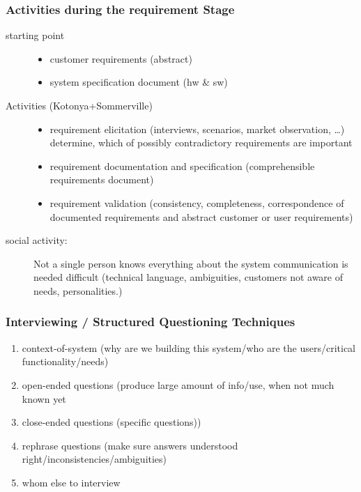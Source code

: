 \documentclass[a4paper, 10pt]{article}
\begin{document}
\subsubsection{Activities during the requirement Stage}
	\begin{description}
		\item[starting point] 
			\begin{itemize}
				\item customer requirements (abstract)
				\item system specification document (hw \& sw)
			\end{itemize}
		\item[Activities (Kotonya+Sommerville)]
			\begin{itemize}
				\item requirement elicitation (interviews, scenarios, market observation, \dots) \\
				determine, which of possibly contradictory requirements are important
				\item requirement documentation and specification (comprehensible requirements document)
				\item requirement validation (consistency, completeness, correspondence of documented requirements and abstract customer or user requirements)
			\end{itemize}
			
			\item[social activity:]
			Not a single person knows everything about the system \follows communication is needed \follows difficult (technical language, ambiguities, customers not aware of needs, personalities.)
	\end{description}

\subsubsection{Interviewing / Structured Questioning Techniques}
\begin{enumerate}
	\item context-of-system (why are we building this system/who are the users/critical functionality/needs)
	\item open-ended questions (produce large amount of info/use, when not much known yet
	\item close-ended questions (specific questions))
	\item rephrase questions (make sure answers understood right/inconsistencies/ambiguities)
	\item whom else to interview
\end{enumerate}
\end{document}

